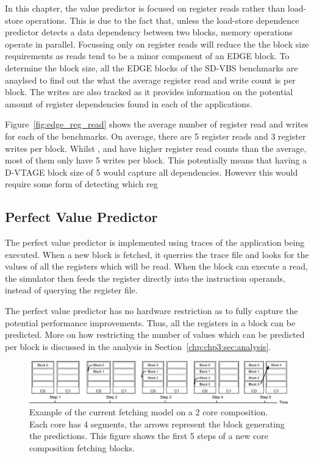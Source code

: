In this chapter, the value predictor is focused on register reads rather than load-store operations.
This is due to the fact that, unless the load-store dependence predictor detects a data dependency between two blocks, memory operations operate in parallel.
Focussing only on register reads will reduce the the block size requirements as reads tend to be a minor component of an EDGE block.
To determine the block size, all the EDGE blocks of the SD-VBS benchmarks are anaylsed to find out the what the average register read and write count is per block.
The writes are also tracked as it provides information on the potential amount of register dependencies found in each of the applications.

Figure~\ref{fig:edge_reg_read} shows the average number of register read and writes for each of the benchmarks.
On average, there are 5 register reads and 3 register writes per block.
Whilst  ,  and  have higher register read counts than the average, most of them only have 5 writes per block.
This potentially means that having a D-VTAGE block size of 5 would capture all dependencies.
However this would require some form of detecting which reg



\subsection{Perfect Value Predictor}

The perfect value predictor is implemented using traces of the application being executed.
When a new block is fetched, it querries the trace file and looks for the values of all the registers which will be read.
When the block can execute a read, the simulator then feeds the register directly into the instruction operands, instead of querying the register file.

The perfect value predictor has no hardware restriction as to fully capture the potential performance improvements.
Thus, all the registers in a block can be predicted.
More on how restricting the number of values which can be predicted per block is discussed in the analysis in Section~\ref{chp:chp3:sec:analysis}.

\begin{figure}[t]
    \centering
    \includegraphics[width=1\textwidth]{chapter3/graphics/normfetch.pdf}
    \caption{Example of the current fetching model on a 2 core composition. Each core has 4 segments, the arrows represent the block generating the predictions. This figure shows the first 5 steps of a new core composition fetching blocks.}
    \label{fig:old_fetch}
\vspace{1em}
\end{figure}
